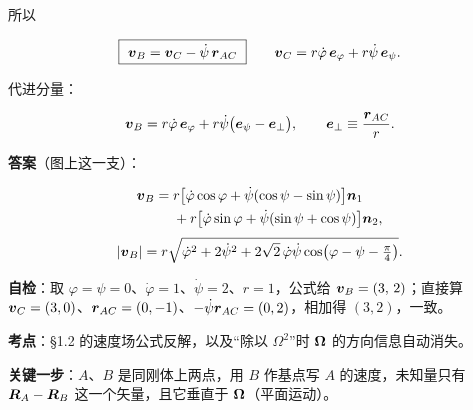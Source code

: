 \documentclass[11pt]{ctexart}
\renewcommand{\qbreak}{\needspace{0.60\textheight}}
\begin{document}

所以

\[
\boxed{\ \vect{v}_B=\vect{v}_C-\dot\psi\,\vect{r}_{AC}\ }
\qquad
\vect{v}_C=r\dot\varphi\,\vect{e}_\varphi+r\dot\psi\,\vect{e}_\psi .
\]

代进分量：

\[
\boldsymbol{v}_B
=r\dot\varphi\,\boldsymbol{e}_\varphi
+r\dot\psi\bigl(\boldsymbol{e}_\psi-\boldsymbol{e}_\perp\bigr),
\qquad
\boldsymbol{e}_\perp\equiv\frac{\boldsymbol{r}_{AC}}{r}.
\]

\textbf{答案}（图上这一支）：

\[
\begin{aligned}
\boldsymbol{v}_B={}&r\bigl[\dot\varphi\cos\varphi+\dot\psi(\cos\psi-\sin\psi)\bigr]\boldsymbol{n}_1\\
&+r\bigl[\dot\varphi\sin\varphi+\dot\psi(\sin\psi+\cos\psi)\bigr]\boldsymbol{n}_2,
\end{aligned}
\]
\[
|\boldsymbol{v}_B|=r\sqrt{\dot\varphi^{2}+2\dot\psi^{2}
+2\sqrt{2}\,\dot\varphi\dot\psi\cos\bigl(\varphi-\psi-\tfrac{\pi}{4}\bigr)} .
\]


\textbf{自检}：取 $\varphi=\psi=0$、$\dot\varphi=1$、$\dot\psi=2$、$r=1$，公式给 $\boldsymbol{v}_B=(3,\,2)$；直接算 $\boldsymbol{v}_C=(3,0)$、$\boldsymbol{r}_{AC}=(0,-1)$、$-\dot\psi\boldsymbol{r}_{AC}=(0,2)$，相加得 $(3,2)$，一致。

\qbreak
{}


\textbf{考点}：§1.2 的速度场公式反解，以及“除以 $\Omega^{2}$”时 $\boldsymbol{\Omega}$ 的方向信息自动消失。

\textbf{关键一步}：$A$、$B$ 是同刚体上两点，用 $B$ 作基点写 $A$ 的速度，未知量只有 $\boldsymbol{R}_A-\boldsymbol{R}_B$ 这一个矢量，且它垂直于 $\boldsymbol{\Omega}$（平面运动）。
\end{document}
